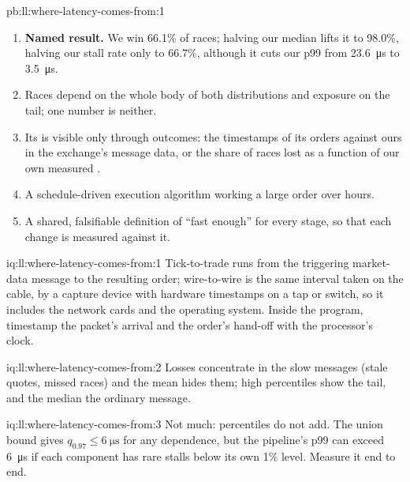 \begin{solution}{pb:ll:where-latency-comes-from:1}
\begin{enumerate}
\item \textbf{Named result.} We win 66.1\% of races; halving our median lifts it to 98.0\%, halving our stall rate only
to 66.7\%, although it cuts our p99 from \qty{23.6}{\micro\second} to \qty{3.5}{\micro\second}.
\item Races depend on the whole body of both distributions and exposure on the tail; one number is neither.
\item Its  is visible only through outcomes: the timestamps of its orders against ours in the exchange's
message data, or the share of races lost as a function of our own measured .
\item A schedule-driven execution algorithm working a large order over hours.
\item A shared, falsifiable definition of ``fast enough'' for every stage, so that each change is measured against it.
\end{enumerate}
\end{solution}

\begin{solution}{iq:ll:where-latency-comes-from:1}
Tick-to-trade runs from the triggering market-data message to the resulting order; wire-to-wire is the same interval
taken on the cable, by a capture device with hardware timestamps on a tap or switch, so it includes the network cards
and the operating system. Inside the program, timestamp the packet's arrival and the order's hand-off with the
processor's clock.
\end{solution}

\begin{solution}{iq:ll:where-latency-comes-from:2}
Losses concentrate in the slow messages (stale quotes, missed races) and the mean hides them; high percentiles show
the tail, and the median the ordinary message.
\end{solution}

\begin{solution}{iq:ll:where-latency-comes-from:3}
Not much: percentiles do not add. The union bound gives $q_{0.97} \le \qty{6}{\micro\second}$ for any dependence, but
the pipeline's p99 can exceed \qty{6}{\micro\second} if each component has rare stalls below its own 1\% level. Measure
it end to end.
\end{solution}

